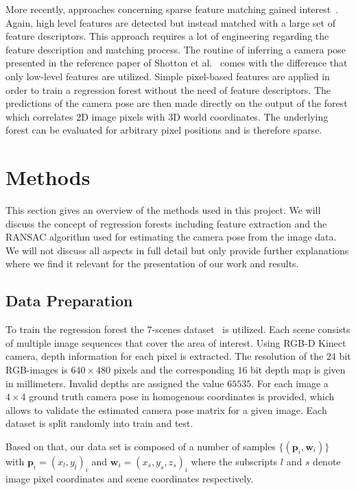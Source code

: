 \documentclass[final]{cvpr}
\begin{document}
More recently, approaches concerning sparse feature matching gained interest~\cite{Holzer2012}. Again, high level features are detected but 
instead matched with a large set of feature descriptors. This approach requires a lot of engineering regarding the feature
description and matching process. The routine of inferring a camera pose presented in the reference paper of Shotton et al.~\cite{shotton2013}
comes with the difference that only low-level features are utilized. Simple pixel-based features are applied in order to train a
regression forest without the need of feature descriptors. The predictions of the camera pose are then made directly on the
output of the forest which correlates 2D image pixels with 3D world coordinates. The underlying forest can be 
evaluated for arbitrary pixel positions and is therefore sparse.


\section{Methods}
This section gives an overview of the methods used in this project. We will discuss
the concept of regression forests including feature extraction and the RANSAC algorithm
used for estimating the camera pose from the image data. We will not discuss all aspects
in full detail but only provide further explanations where we find it relevant
for the presentation of our work and results.

\subsection{Data Preparation}
To train the regression forest the 7-scenes dataset~\cite{glocker2013} is utilized. 
Each scene consists of multiple image sequences that cover the area of interest. Using RGB-D 
Kinect camera, depth information for each pixel is extracted. The resolution of the $24$ 
bit RGB-images is $640\times480$ pixels and the corresponding $16$ bit depth map is given 
in millimeters. Invalid depths are assigned the value $65535$. For each image a $4\times4$ 
ground truth camera pose in homogenous coordinates 
is provided, which allows to validate the estimated camera pose matrix for a given image. 
Each dataset is split randomly into train and test. 

Based on that, our data set is composed of a number of samples $\{(\boldsymbol{p}_i, \boldsymbol{w}_i)\}$ with
$\boldsymbol{p}_i = (x_l, y_l)_i$ and $\boldsymbol{w}_i = (x_s, y_s, z_s)_i$ where the subscripts
$l$ and $s$ denote image pixel coordinates and scene coordinates respectively.\\
\end{document}
